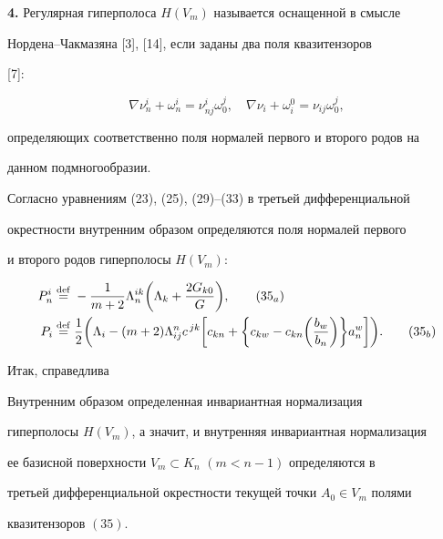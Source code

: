  


 


{\bf 4.} Регулярная гиперполоса $H(V_m)$ называется оснащенной в смысле 


Нордена--Чакмазяна [3], [14], если заданы два поля квазитензоров 


[7]: 


\begin{equation} 


\nabla\nu^i_n+\omega^i_n=\nu^i_{nj}\omega^j_0,\quad 


\nabla\nu_i+\omega^0_i=\nu_{ij}\omega^j_0, 


\end{equation} 


определяющих соответственно поля нормалей первого и второго родов на 


данном подмногообразии. 


 


Согласно уравнениям (23), (25), (29)--(33) в третьей дифференциальной 


окрестности внутренним образом определяются поля нормалей первого 


и второго родов гиперполосы $H(V_m)$: 


\begin{align} 


P^i_n&\eqdef-\frac{1}{m+2}\Lambda^{ik}_n 


\bigg(\Lambda_k+\frac{2G_{k0}}{G} \bigg),\tag{35${}_a$} \\ 


% 


P_i&\eqdef\frac{1}{2}\bigg(\Lambda_i-(m+2)\Lambda^n_{ij}c^{\,jk} 


\bigg[c_{kn}+\bigg\{c_{kw}-c_{kn}\bigg(\frac{b_w}{b_n} \bigg) 


\bigg\}a^w_n\bigg]\bigg).\tag{35${}_b$} 


\end{align} 


\addtocounter{equation}{1}


 


Итак, справедлива 


 


\begin{thm} 


Внутренним образом определенная инвариантная нормализация 


гиперполосы $H(V_m)$, а значит, и внутренняя инвариантная нормализация 


ее базисной поверхности $V_m\subset K_n$ $(m<n-1)$ определяются в 


третьей дифференциальной окрестности текущей точки $A_0\in V_m$ полями 


квазитензоров $(35)$. 


\end{thm} 


